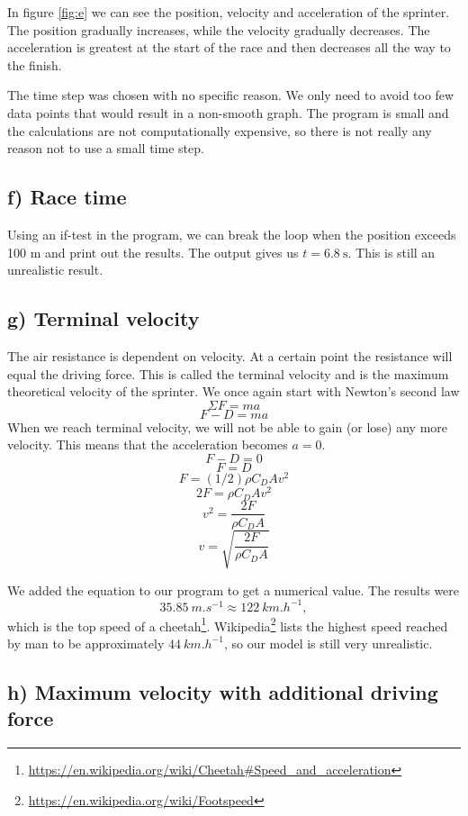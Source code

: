 \documentclass[a4paper,10pt,english]{article}
\begin{document}
In figure \ref{fig:e} we can see the position, velocity and acceleration of the sprinter. The position gradually increases, while the velocity gradually decreases. The acceleration is greatest at the start of the race and then decreases all the way to the finish.

The time step was chosen with no specific reason. We only need to avoid too few data points that would result in a non-smooth graph. The program is small and the calculations are not computationally expensive, so there is not really any reason not to use a small time step.

\subsection*{f) Race time}

Using an if-test in the program, we can break the loop when the position exceeds 100 m and print out the results. The output gives us $t=\SI{6.8}{\second}$. This is still an unrealistic result.


\subsection*{g) Terminal velocity}

The air resistance is dependent on velocity. At a certain point the resistance will equal the driving force. This is called the terminal velocity and is the maximum theoretical velocity of the sprinter. We once again start with Newton's second law
\[\Sigma F=ma\]
\[F-D=ma\]
When we reach terminal velocity, we will not be able to gain (or lose) any more velocity. This means that the acceleration becomes $a=0$.
\[F-D=0\]
\[F=D\]
\[F=(1/2)\rho C_D Av^2\]
\[2F=\rho C_D Av^2\]
\[v^2=\frac{2F}{\rho C_D A}\]
\[v=\sqrt{\frac{2F}{\rho C_D A}}\]

We added the equation to our program to get a numerical value. The results were 
\[\SI{35.85}{m.s^{-1}}\approx \SI{122}{km.h^{-1}},\]
which is the top speed of a cheetah\footnote{\url{https://en.wikipedia.org/wiki/Cheetah\#Speed_and_acceleration}}. Wikipedia\footnote{\url{https://en.wikipedia.org/wiki/Footspeed}} lists the highest speed reached by man to be approximately $\SI{44}{km.h^{-1}}$, so our model is still very unrealistic.

\subsection*{h) Maximum velocity with additional driving force}
\end{document}
